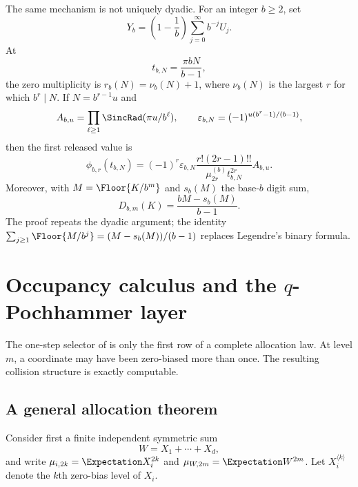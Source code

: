 \documentclass[11pt,oneside]{article}
\theoremstyle{definition}
\theoremstyle{remark}
\begin{document}
The same mechanism is not uniquely dyadic.  For an integer $b\ge2$, set
\begin{equation}
 Y_b=\left(1-\frac1b\right)
     \sum_{j=0}^{\infty}b^{-j}U_j.                  \label{eq:Yb}
\end{equation}
At
\begin{equation}
 t_{b,N}=\frac{\pi bN}{b-1},                        \label{eq:tbN}
\end{equation}
the zero multiplicity is $r_b(N)=\nu_b(N)+1$, where $\nu_b(N)$ is the largest
$r$ for which $b^r\mid N$.  If $N=b^{r-1}u$ and
\begin{equation}
 A_{b,u}=\prod_{\ell\ge1}\SincRad(\pi u/b^\ell),
 \qquad
 \varepsilon_{b,N}=(-1)^{u(b^r-1)/(b-1)},           \label{eq:baseb-tail-sign}
\end{equation}
then the first released value is
\begin{equation}
 \phi_{b,r}(t_{b,N})
 =(-1)^r\varepsilon_{b,N}
   \frac{r!(2r-1)!!}{\mu^{(b)}_{2r}t_{b,N}^{2r}}A_{b,u}.       \label{eq:baseb-release}
\end{equation}
Moreover, with $M=\Floor{K/b^m}$ and $s_b(M)$ the base-$b$ digit sum,
\begin{equation}
 D_{b,m}(K)
 =\frac{bM-s_b(M)}{b-1}.                            \label{eq:baseb-divisor}
\end{equation}
The proof repeats the dyadic argument; the identity
$\sum_{j\ge1}\Floor{M/b^j}=(M-s_b(M))/(b-1)$ replaces Legendre's
binary formula.

\section{Occupancy calculus and the \texorpdfstring{$q$}{q}-Pochhammer layer}
\label{sec:occupancy}

The one-step selector of  is only the first row of a
complete allocation law.  At level $m$, a coordinate may have been zero-biased
more than once.  The resulting collision structure is exactly computable.

\subsection{A general allocation theorem}

Consider first a finite independent symmetric sum
\begin{equation}
 W=X_1+\cdots+X_d,                                  \label{eq:finite-sum}
\end{equation}
and write $\mu_{i,2k}=\Expectation X_i^{2k}$ and
$\mu_{W,2m}=\Expectation W^{2m}$.  Let $X_i^{\langle k\rangle}$ denote the $k$th
zero-bias level of $X_i$.
\end{document}
